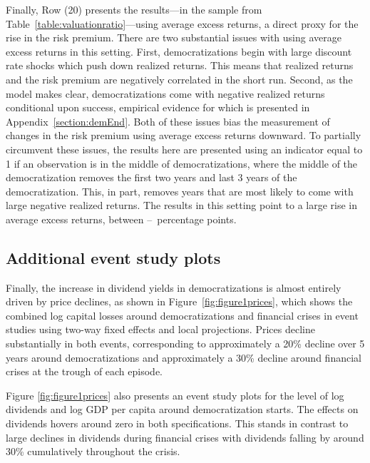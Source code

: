Finally, Row (20) presents the results---in the sample from Table~\ref{table:valuationratio}---using average excess returns, a direct proxy for the rise in the risk premium. There are two substantial issues with using average excess returns in this setting. First, democratizations begin with large discount rate shocks which push down realized returns. This means that realized returns and the risk premium are negatively correlated in the short run. Second, as the model makes clear, democratizations come with negative realized returns conditional upon success, empirical evidence for which is presented in Appendix~\ref{section:demEnd}. Both of these issues bias the measurement of changes in the risk premium using average excess returns downward. To partially circumvent these issues, the results here are presented using an indicator equal to 1 if an observation is in the middle of democratizations, where the middle of the democratization removes the first two years and last 3 years of the democratization. This, in part, removes years that are most likely to come with large negative realized returns. The results in this setting point to a large rise in average excess returns, between \tabBThreeExcRetLow\---\tabBThreeExcRetHigh\ percentage points.

\subsection{Additional event study plots}



Finally, the increase in dividend yields in democratizations is almost entirely driven by price declines, as shown in Figure~\ref{fig:figure1prices}, which shows the combined log capital losses around democratizations and financial crises in event studies using two-way fixed effects and local projections. Prices decline substantially in both events, corresponding to approximately a 20\% decline over 5 years around democratizations and approximately a 30\% decline around financial crises at the trough of each episode.

Figure \ref{fig:figure1prices} also presents an event study plots for the level of log dividends and log GDP per capita around democratization starts. The effects on dividends hovers around zero in both specifications. This stands in contrast to large declines in dividends during financial crises with dividends falling by around 30\% cumulatively throughout the crisis.

